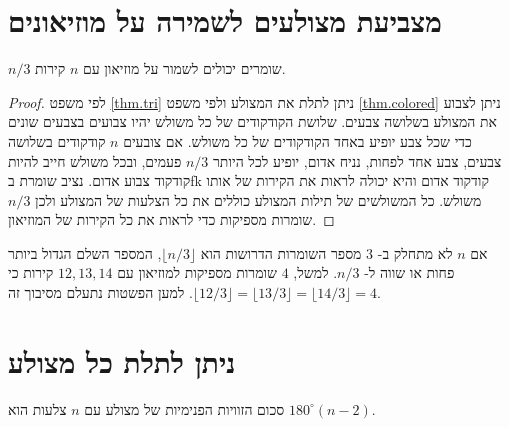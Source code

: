 
\section{מצביעת מצולעים לשמירה על מוזיאונים}\label{s.museum-guard}

\begin{theorem}
$n/3$
שומרים יכולים לשמור על מוזיאון עם 
$n$
קירות.
\end{theorem}
\begin{proof}
לפי משפט
\ref{thm.tri}
ניתן לתלת את המצולע ולפי משפט
\ref{thm.colored}
ניתן לצבוע את המצולע בשלושה צבעים. שלושת הקודקודים של כל משולש יהיו צבועים בצבעים שונים כדי שכל צבע יופיע באחד הקודקודים של כל משולש. אם צובעים 
$n$
קודקודים בשלושה צבעים, צבע אחד לפחות, נניח אדום, יופיע לכל היותר
$n/3$
פעמים, ובכל משולש חייב להיות קודקוד צבוע אדום. נציב שומרת בfk קודקוד אדום והיא יכולה לראות את הקירות של אותו משולש. כל המשולשים של תילות המצולע כוללים את כל הצלעות של המצולע ולכן
$n/3$
שומרות מספיקות כדי לראות את כל הקירות של המוזיאון.
\end{proof}
אם
$n$
לא מתחלק ב-%
$3$
מספר השומרות הדרושות הוא
$\lfloor n/3\rfloor$, 
המספר השלם הגדול ביותר פחות או שווה ל-%
$n/3$.
למשל, 
$4$
שומרות מספיקות למוזיאון עם 
$12, 13, 14$
קירות כי
$\lfloor 12/3\rfloor =\lfloor 13/3\rfloor=\lfloor 14/3\rfloor=4$. 
למען הפשטות נתעלם מסיבוך זה.


\section{ניתן לתלת כל מצולע}\label{s.museum-triangulated}

\begin{theorem}\label{thm.interior-angles-of-a-polygon}
סכום הזוויות הפנימיות של מצולע עם
$n$
צלעות הוא
$180^\circ(n-2)$.
\end{theorem}

